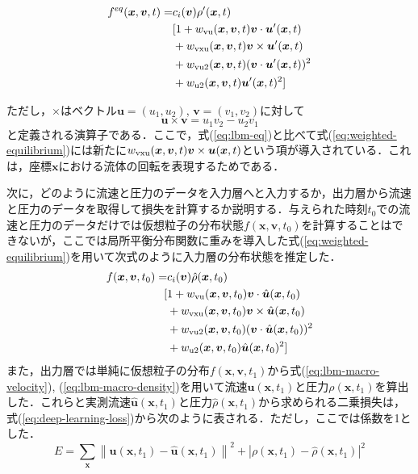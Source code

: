 \begin{equation}
\begin{split}
  f^{eq}(\bm{x}, \bm{v}, t) =
  &c_i(\bm{v}) \rho'(\bm{x}, t) \\
  &[ 1 + w_{\rm{vu}}(\bm{x}, \bm{v}, t)\bm{v} \cdot \bm{u}'(\bm{x}, t) \\
  &+ w_{\rm{vxu}}(\bm{x}, \bm{v}, t)\bm{v} \times \bm{u}'(\bm{x}, t) \\
  &+ w_{\rm{vu2}}(\bm{x}, \bm{v}, t)(\bm{v} \cdot \bm{u}'(\bm{x}, t))^2 \\
  &+ w_{\rm{u2}}(\bm{x}, \bm{v}, t)\bm{u}'(\bm{x}, t)^2 ]
\end{split}
  \label{eq:weighted-equilibrium}
\end{equation}

ただし，$\times$はベクトル$\bm{u} = (u_1, u_2)$, $\bm{v} = (v_1, v_2)$に対して
\begin{equation}
  \bm{u} \times \bm{v} = u_1 v_2 - u_2 v_1
  \label{eq:cross-product}
\end{equation}
と定義される演算子である．ここで，式(\ref{eq:lbm-eq})と比べて式(\ref{eq:weighted-equilibrium})には新たに$w_{\rm{vxu}}(\bm{x}, \bm{v}, t)\bm{v} \times \bm{u}(\bm{x}, t)$という項が導入されている．これは，座標$\bm{x}$における流体の回転を表現するためである．

次に，どのように流速と圧力のデータを入力層へと入力するか，出力層から流速と圧力のデータを取得して損失を計算するか説明する．与えられた時刻$t_0$での流速と圧力のデータだけでは仮想粒子の分布状態$f(\bm{x}, \bm{v}, t_0)$を計算することはできないが，ここでは局所平衡分布関数に重みを導入した式(\ref{eq:weighted-equilibrium})を用いて次式のように入力層の分布状態を推定した．
\begin{equation}
  \begin{split}
  f(\bm{x}, \bm{v}, t_0) = 
  &c_i(\bm{v}) \hat{\rho}(\bm{x}, t_0) \\ [ 
    &1 
    + w_{\rm{vu}}(\bm{x}, \bm{v}, t_0)\bm{v} \cdot \hat{\bm{u}}(\bm{x}, t_0) \\
    &+ w_{\rm{vxu}}(\bm{x}, \bm{v}, t_0)\bm{v} \times \hat{\bm{u}}(\bm{x}, t_0) \\
    &+ w_{\rm{vu2}}(\bm{x}, \bm{v}, t_0)(\bm{v} \cdot \hat{\bm{u}}(\bm{x}, t_0))^2 \\
    &+ w_{\rm{u2}}(\bm{x}, \bm{v}, t_0)\hat{\bm{u}}(\bm{x}, t_0)^2 
  ]
  \end{split}
  \label{eq:input-layer}
\end{equation}
また，出力層では単純に仮想粒子の分布$f(\bm{x}, \bm{v}, t_1)$から式(\ref{eq:lbm-macro-velocity}), (\ref{eq:lbm-macro-density})を用いて流速$\bm{u}(\bm{x}, t_1)$と圧力$\rho(\bm{x}, t_1)$を算出した．これらと実測流速$\hat{\bm{u}}(\bm{x}, t_1)$と圧力$\hat{\rho}(\bm{x}, t_1)$から求められる二乗損失は，式(\ref{eq:deep-learning-loss})から次のように表される．ただし，ここでは係数を1とした．
\begin{equation}
  E = \sum_{\bm{x}} 
  \left\| \bm{u}(\bm{x}, t_1) - \hat{\bm{u}}(\bm{x}, t_1) \right\|^2 +
  \left| \rho(\bm{x}, t_1) - \hat{\rho}(\bm{x}, t_1) \right|^2
  \label{eq:error-function}
\end{equation}

